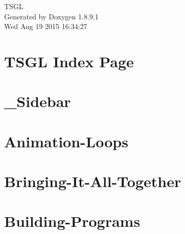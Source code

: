 \documentclass[twoside]{book}
\newcommand{\+}{\discretionary{\mbox{\scriptsize$\hookleftarrow$}}{}{}}
\newcommand{\clearemptydoublepage}{%
  \newpage{\pagestyle{empty}\cleardoublepage}%
}
\begin{document}
\hypersetup{pageanchor=false,
             bookmarks=true,
             bookmarksnumbered=true,
             pdfencoding=unicode
            }
\begin{titlepage}
\vspace*{7cm}
\begin{center}%
{\Large T\+S\+G\+L }\\
\vspace*{1cm}
{\large Generated by Doxygen 1.8.9.1}\\
\vspace*{0.5cm}
{\small Wed Aug 19 2015 16:34:27}\\
\end{center}
\end{titlepage}
\clearemptydoublepage
\tableofcontents
\clearemptydoublepage
{}
\hypersetup{pageanchor=true}

\chapter{T\+S\+G\+L Index Page}
\label{index}\hypertarget{index}{}
\chapter{\+\_\+\+Sidebar}
\label{md__home_pretzel_workspace_tsgl__t_s_g_l_docs-wiki___sidebar}
\hypertarget{md__home_pretzel_workspace_tsgl__t_s_g_l_docs-wiki___sidebar}{}

\chapter{Animation-\/\+Loops}
\label{md__home_pretzel_workspace_tsgl__t_s_g_l_docs-wiki__animation-_loops}
\hypertarget{md__home_pretzel_workspace_tsgl__t_s_g_l_docs-wiki__animation-_loops}{}

\chapter{Bringing-\/\+It-\/\+All-\/\+Together}
\label{md__home_pretzel_workspace_tsgl__t_s_g_l_docs-wiki__bringing-_it-_all-_together}
\hypertarget{md__home_pretzel_workspace_tsgl__t_s_g_l_docs-wiki__bringing-_it-_all-_together}{}

\chapter{Building-\/\+Programs}
\label{md__home_pretzel_workspace_tsgl__t_s_g_l_docs-wiki__building-_programs}
\hypertarget{md__home_pretzel_workspace_tsgl__t_s_g_l_docs-wiki__building-_programs}{}

\end{document}
